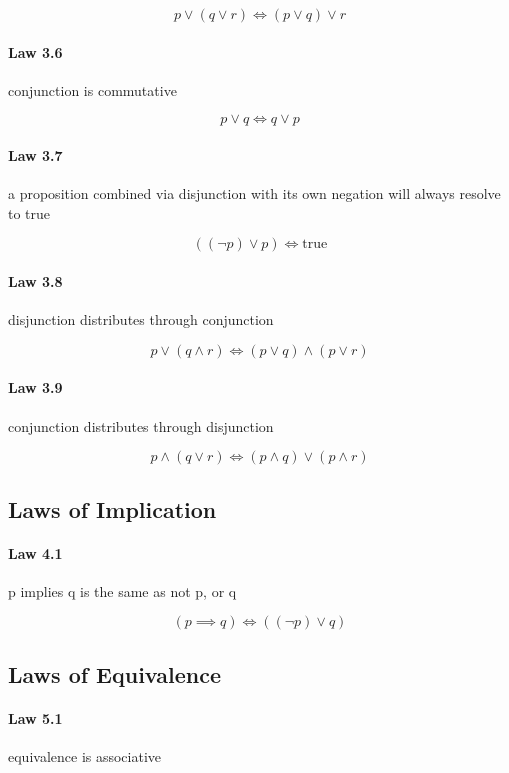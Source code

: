 \documentclass[twocolumn]{article}
\begin{document}
$$ p  \vee  (q  \vee  r)  \iff  (p  \vee  q)  \vee  r $$

\paragraph{Law 3.6} conjunction is commutative

$$ p \vee q  \iff q \vee p $$

\paragraph{Law 3.7} a proposition combined via disjunction with its own negation will always resolve to true

$$ (( \neg p)  \vee  p)  \iff  \text{true} $$

\paragraph{Law 3.8} disjunction distributes through conjunction

$$ p  \vee  (q  \wedge  r)  \iff  (p  \vee  q)  \wedge  (p  \vee  r) $$

\paragraph{Law 3.9} conjunction distributes through disjunction

$$ p  \wedge  (q  \vee  r)  \iff  (p  \wedge  q)  \vee  (p  \wedge  r) $$

\subsection{Laws of Implication}

\paragraph{Law 4.1} p implies q is the same as not p, or q

$$ (p  \implies   q)  \iff  (( \neg p)  \vee  q) $$

\subsection{Laws of Equivalence}

\paragraph{Law 5.1} equivalence is associative
\end{document}
